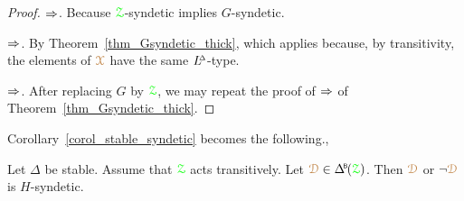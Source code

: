 \begin{proof} 
  $\Rightarrow$.
  Because ${\color{green}\EuScript Z}$-syndetic implies $G$-syndetic.
  
  $\Rightarrow$.
  By Theorem~\ref{thm_Gsyndetic_thick}, which applies because, by transitivity, the elements of ${\color{brown}\EuScript X}$ have the same $L\kern-.5ex^{\scriptscriptstyle\Delta}$-type.

  $\Rightarrow$.
  After replacing $G$ by ${\color{green}\EuScript Z}$, we may repeat the proof of $\Rightarrow$ of Theorem~\ref{thm_Gsyndetic_thick}.
\end{proof}

Corollary~\ref{corol_stable_syndetic} becomes the following.,

\begin{corollary}\label{corol_syndeticornotsyndetic}
  Let $\Delta$ be stable.
  Assume that ${\color{green}\EuScript Z}$ acts transitively.
  Let $\mrD\in\BDelta(\grZ)$.
  Then ${\color{brown}\EuScript D}$ or $\neg{\color{brown}\EuScript D}$ is $H$-syndetic.
\end{corollary}


